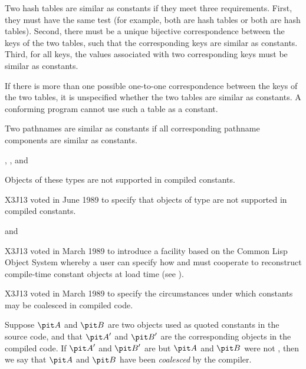 \begin{newer}
\begin{flushdesc}
  Two hash tables are similar as constants if they meet
  three requirements.
  First, they must have the same test (for example, both are  hash tables
  or both are  hash tables).
  Second, there must be a unique bijective correspondence between the keys of
      the two tables, such that the corresponding keys are similar as
      constants.
  Third, for all keys, the values associated with two corresponding keys
      must be similar as constants.

  If there is more than one possible one-to-one correspondence between
  the keys of the two tables, it is unspecified whether the two
  tables are similar as constants.  A conforming
  program cannot use such a table as a constant.

\item[\cd{pathname}]

  Two pathnames are similar as constants if all corresponding pathname
  components are similar as constants.

\item[\cd{stream}, \cd{readtable}, and \cd{method}]

  Objects of these types are not supported in compiled constants.

\item[\cd{function}]


   X3J13 voted in June 1989 
   to specify that objects of type 
   are not supported in compiled constants.

\item[\cd{structure} and \cd{standard-object}]

   X3J13 voted in March 1989  to introduce a facility
based on the Common Lisp Object System
whereby a user can specify how  and 
must cooperate to reconstruct compile-time constant objects at load time
(see ).
\end{flushdesc}

   X3J13 voted in March 1989  to specify
the circumstances under which constants may be coalesced in compiled code.

Suppose ${\it A}$ and ${\it B}$ are two
objects used as quoted constants in the source code, and that ${\it A}'$ and
${\it B}'$ are the corresponding objects in the compiled code.  If ${\it A}'$ and ${\it B}'$
are  but ${\it A}$ and ${\it B}$ were not , then we say that ${\it A}$ and ${\it B}$ have been
{\it coalesced} by the compiler.


\end{newer}
